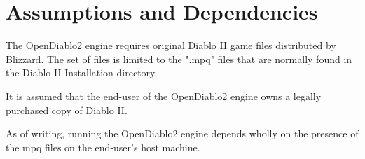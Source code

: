 \section{Assumptions and Dependencies} \label{sec:assumptionsdependencies}


The OpenDiablo2 engine requires original Diablo II game files distributed by Blizzard.
The set of files is limited to the ".mpq" files that are normally found in the Diablo II Installation directory.

It is assumed that the end-user of the OpenDiablo2 engine owns a legally purchased copy of Diablo II.

As of writing, running the OpenDiablo2 engine depends wholly on the presence of the mpq files on the end-user's host machine.

